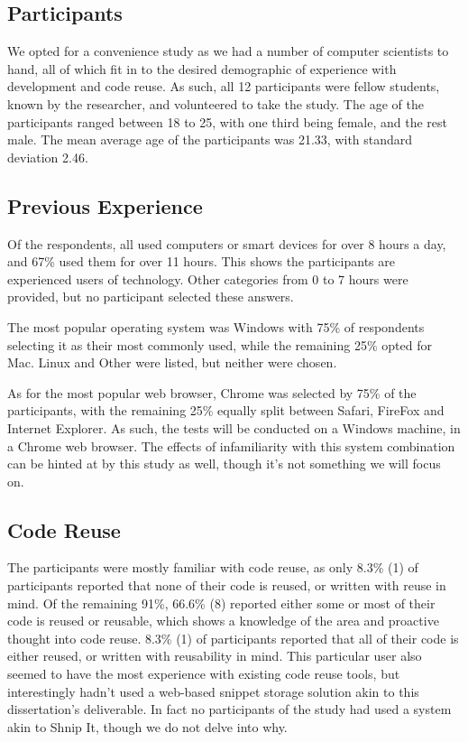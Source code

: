 \subsection{Participants} \label{participants}
We opted for a convenience study as we had a number of computer scientists to hand, all of which fit in to the desired demographic of experience with development and code reuse.
As such, all 12 participants were fellow students, known by the researcher, and volunteered to take the study.
The age of the participants ranged between 18 to 25, with one third being female, and the rest male.
The mean average age of the participants was 21.33, with standard deviation 2.46.

\subsection{Previous Experience} \label{prevex}
Of the respondents, all used computers or smart devices for over 8 hours a day, and 67\% used them for over 11 hours. This shows the participants are experienced users of technology. 
Other categories from 0 to 7 hours were provided, but no participant selected these answers.

The most popular operating system was Windows with 75\% of respondents selecting it as their most commonly used, while the remaining 25\% opted for Mac. Linux and Other were listed, but neither were chosen.

As for the most popular web browser, Chrome was selected by 75\% of the participants, with the remaining 25\% equally split between Safari, FireFox and Internet Explorer. 
As such, the tests will be conducted on a Windows machine, in a Chrome web browser. 
The effects of infamiliarity with this system combination can be hinted at by this study as well, though it's not something we will focus on.

\subsection{Code Reuse}
The participants were mostly familiar with code reuse, as only 8.3\% (1) of participants reported that none of their code is reused, or written with reuse in mind.
Of the remaining 91\%, 66.6\% (8) reported either some or most of their code is reused or reusable, which shows a knowledge of the area and proactive thought into code reuse. 8.3\% (1) of participants reported that all of their code is either reused, or written with reusability in mind.
This particular user also seemed to have the most experience with existing code reuse tools, but interestingly hadn't used a web-based snippet storage solution akin to this dissertation's deliverable.
In fact no participants of the study had used a system akin to Shnip It, though we do not delve into why.

